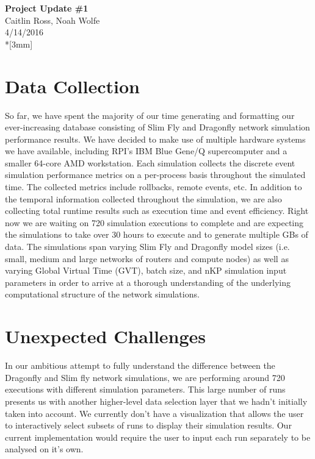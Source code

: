 \documentclass[12pt]{article}
\begin{document}
\thispagestyle{empty}
\begin{center}
{\Large\bf Project Update \#1}
\vspace{3mm}
\\Caitlin Ross, Noah Wolfe
\\4/14/2016
\\*[3mm]
\end{center}

\section{Data Collection}
So far, we have spent the majority of our time generating and formatting our ever-increasing database consisting of Slim Fly and Dragonfly network simulation performance results. We have decided to make use of multiple hardware systems we have available, including RPI's IBM Blue Gene/Q supercomputer and a smaller 64-core AMD workstation. Each simulation collects the discrete event simulation performance metrics on a per-process basis throughout the simulated time. The collected metrics include rollbacks, remote events, etc. In addition to the temporal information collected throughout the simulation, we are also collecting total runtime results such as execution time and event efficiency. Right now we are waiting on 720 simulation executions to complete and are expecting the simulations to take over 30 hours to execute and to generate multiple GBs of data. The simulations span varying Slim Fly and Dragonfly model sizes (i.e. small, medium and large networks of routers and compute nodes) as well as varying Global Virtual Time (GVT), batch size, and nKP simulation input parameters in order to arrive at a thorough understanding of the underlying computational structure of the network simulations. 

\section{Unexpected Challenges}
In our ambitious attempt to fully understand the difference between the Dragonfly and Slim fly network simulations, we are performing around 720 executions with different simulation parameters. This large number of runs presents us with another higher-level data selection layer that we hadn't initially taken into account. We currently don't have a visualization that allows the user to interactively select subsets of runs to display their simulation results. Our current implementation would require the user to input each run separately to be analysed on it's own.
\end{document}
